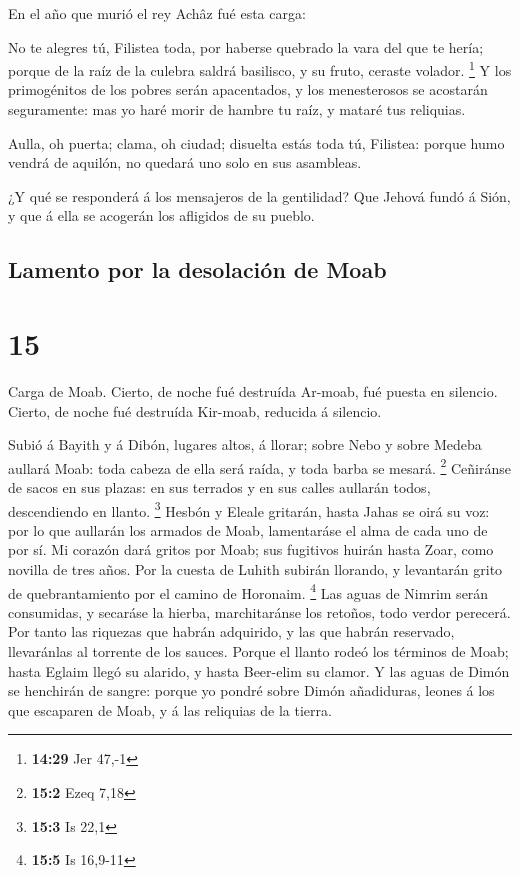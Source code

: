  En el año que murió el rey Achâz fué esta carga:

 No te alegres tú, Filistea toda, por haberse quebrado la
vara del que te hería; porque de la raíz de la culebra saldrá basilisco,
y su fruto, ceraste volador. \footnote{\textbf{14:29} Jer 47,-1}
 Y los primogénitos de los pobres serán apacentados, y
los menesterosos se acostarán seguramente: mas yo haré morir de hambre
tu raíz, y mataré tus reliquias.

 Aulla, oh puerta; clama, oh ciudad; disuelta estás toda
tú, Filistea: porque humo vendrá de aquilón, no quedará uno solo en sus
asambleas.

 ¿Y qué se responderá á los mensajeros de la gentilidad?
Que Jehová fundó á Sión, y que á ella se acogerán los afligidos de su
pueblo.

\hypertarget{lamento-por-la-desolaciuxf3n-de-moab}{%
\subsection{Lamento por la desolación de
Moab}\label{lamento-por-la-desolaciuxf3n-de-moab}}

\hypertarget{section-14}{%
\section{15}\label{section-14}}

 Carga de Moab. Cierto, de noche fué destruída Ar-moab,
fué puesta en silencio. Cierto, de noche fué destruída Kir-moab,
reducida á silencio.

 Subió á Bayith y á Dibón, lugares altos, á llorar; sobre
Nebo y sobre Medeba aullará Moab: toda cabeza de ella será raída, y toda
barba se mesará. \footnote{\textbf{15:2} Ezeq 7,18} 
Ceñiránse de sacos en sus plazas: en sus terrados y en sus calles
aullarán todos, descendiendo en llanto. \footnote{\textbf{15:3} Is 22,1}
 Hesbón y Eleale gritarán, hasta Jahas se oirá su voz: por
lo que aullarán los armados de Moab, lamentaráse el alma de cada uno de
por sí.  Mi corazón dará gritos por Moab; sus fugitivos
huirán hasta Zoar, como novilla de tres años. Por la cuesta de Luhith
subirán llorando, y levantarán grito de quebrantamiento por el camino de
Horonaim. \footnote{\textbf{15:5} Is 16,9-11}  Las aguas
de Nimrim serán consumidas, y secaráse la hierba, marchitaránse los
retoños, todo verdor perecerá.  Por tanto las riquezas que
habrán adquirido, y las que habrán reservado, llevaránlas al torrente de
los sauces.  Porque el llanto rodeó los términos de Moab;
hasta Eglaim llegó su alarido, y hasta Beer-elim su clamor.
 Y las aguas de Dimón se henchirán de sangre: porque yo
pondré sobre Dimón añadiduras, leones á los que escaparen de Moab, y á
las reliquias de la tierra.

